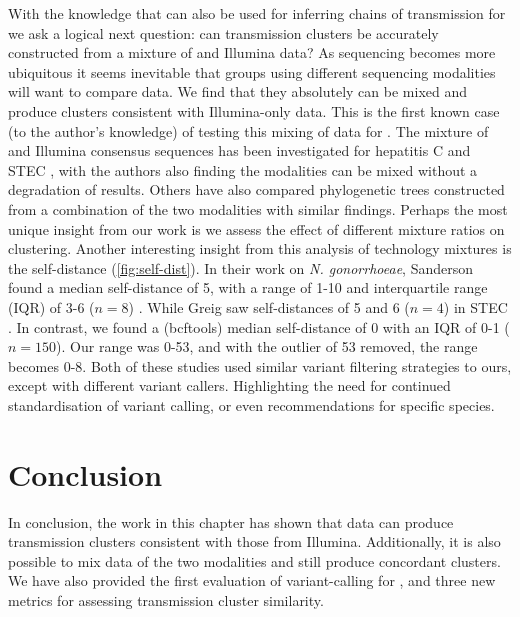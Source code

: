 With the knowledge that \ont{} can also be used for inferring chains of transmission for \mtb{} we ask a logical next question: can transmission clusters be accurately constructed from a mixture of \ont{} and Illumina data? As \ont{} sequencing becomes more ubiquitous it seems inevitable that groups using different sequencing modalities will want to compare data. We find that they absolutely can be mixed and produce clusters consistent with Illumina-only data. This is the first known case (to the author's knowledge) of testing this mixing of data for \mtb{}. The mixture of \ont{} and Illumina consensus sequences has been investigated for hepatitis C \cite{riaz2021} and STEC \cite{greig2021}, with the authors also finding the modalities can be mixed without a degradation of results. Others have also compared phylogenetic trees constructed from a combination of the two modalities \cite{lijun2020,McNaughton2019,greig2021} with similar findings. Perhaps the most unique insight from our work is we assess the effect of different mixture ratios on clustering. Another interesting insight from this analysis of technology mixtures is the self-distance (\autoref{fig:self-dist}). In their work on \textit{N. gonorrhoeae}, Sanderson \etal{} found a median self-distance of 5, with a range of 1-10 and interquartile range (IQR) of 3-6 ($n=8$) \cite{sanderson2020}. While Greig \etal{} saw self-distances of 5 and 6 ($n=4$) in STEC \cite{greig2021}. In contrast, we found a (bcftools) median self-distance of 0 with an IQR of 0-1 ($n=150$). Our range was 0-53, and with the outlier of 53 removed, the range becomes 0-8. Both of these studies used similar variant filtering strategies to ours, except with different variant callers. Highlighting the need for continued standardisation of \ont{} variant calling, or even recommendations for specific species.


\section{Conclusion}

In conclusion, the work in this chapter has shown that \ont{} data can produce transmission clusters consistent with those from Illumina. Additionally, it is also possible to mix data of the two modalities and still produce concordant clusters. We have also provided the first evaluation of \ont{} variant-calling for \mtb{}, and three new metrics for assessing transmission cluster similarity.

